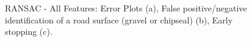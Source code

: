 \documentclass[numbered,pdftex]{ohio-etd}
\begin{document}
{\begin{figure}[H]
			
			\caption[RAN All Error Plots]{RANSAC - All Features: Error Plots (a), False positive/negative identification of a road surface (gravel or chipseal) (b), Early stopping (c).}
			
			\label{fig:ran_all_error_plots}
			
		\end{figure}

		\begin{figure}[H]
			
			
			
			

\end{figure}}
\end{document}
